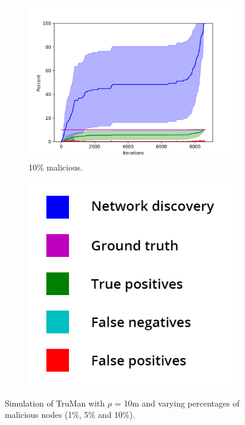 \begin{figure}
\begin{subfigure}{0.5\textwidth}
\includegraphics[width=\linewidth]{images/plots/Network_rA/10_10.png}
\caption{10\% malicious.}
\end{subfigure}
\hspace*{\fill} %
\begin{subfigure}{0.3\textwidth}
\includegraphics[width=\linewidth]{images/legend2.png}
\end{subfigure}

\caption{Simulation of TruMan with $\rho$ = 10m and varying percentages of malicious nodes (1\%, 5\% and 10\%).}
\label{fig:randommalicious1}
\end{figure}

